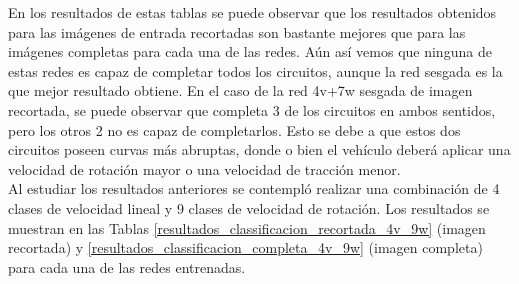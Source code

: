 En los resultados de estas tablas se puede observar que los resultados obtenidos para las imágenes de entrada recortadas son bastante mejores que para las imágenes completas para cada una de las redes. Aún así vemos que ninguna de estas redes es capaz de completar todos los circuitos, aunque la red sesgada es la que mejor resultado obtiene. En el caso de la red 4v+7w sesgada de imagen recortada, se puede observar que completa 3 de los circuitos en ambos sentidos, pero los otros 2 no es capaz de completarlos. Esto se debe a que estos dos circuitos poseen curvas más abruptas, donde o bien el vehículo deberá aplicar una velocidad de rotación mayor o una velocidad de tracción menor.\\

Al estudiar los resultados anteriores se contempló realizar una combinación de 4 clases de velocidad lineal y 9 clases de velocidad de rotación. Los resultados se muestran en las Tablas \ref{resultados_classificacion_recortada_4v_9w} (imagen recortada) y \ref{resultados_classificacion_completa_4v_9w} (imagen completa) para cada una de las redes entrenadas.\\


